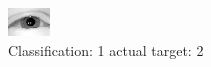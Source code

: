 \begin{figure}[h!]
\begin{center}
\includegraphics[width=0.60\columnwidth]{figures/ID2333_class_1_target_2.png}
\end{center}
\caption{ Classification: 1 actual target: 2}
\label{fig:ID2333_class_1_target_2}
\end{figure}
